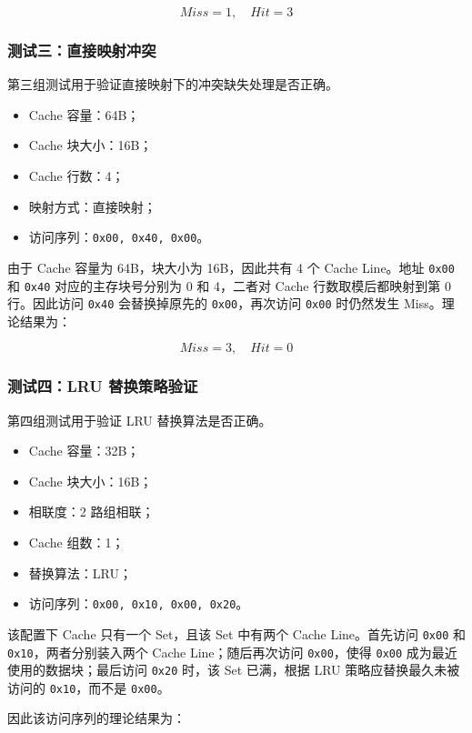 \[
Miss = 1,\quad Hit = 3
\]

\subsubsection{测试三：直接映射冲突}

第三组测试用于验证直接映射下的冲突缺失处理是否正确。

\begin{itemize}
    \item Cache 容量：64B；
    \item Cache 块大小：16B；
    \item Cache 行数：4；
    \item 映射方式：直接映射；
    \item 访问序列：\texttt{0x00, 0x40, 0x00}。
\end{itemize}

由于 Cache 容量为 64B，块大小为 16B，因此共有 4 个 Cache Line。地址 \texttt{0x00} 和 \texttt{0x40} 对应的主存块号分别为 0 和 4，二者对 Cache 行数取模后都映射到第 0 行。因此访问 \texttt{0x40} 会替换掉原先的 \texttt{0x00}，再次访问 \texttt{0x00} 时仍然发生 Miss。理论结果为：

\[
Miss = 3,\quad Hit = 0
\]

\subsubsection{测试四：LRU 替换策略验证}

第四组测试用于验证 LRU 替换算法是否正确。

\begin{itemize}
    \item Cache 容量：32B；
    \item Cache 块大小：16B；
    \item 相联度：2 路组相联；
    \item Cache 组数：1；
    \item 替换算法：LRU；
    \item 访问序列：\texttt{0x00, 0x10, 0x00, 0x20}。
\end{itemize}

该配置下 Cache 只有一个 Set，且该 Set 中有两个 Cache Line。首先访问 \texttt{0x00} 和 \texttt{0x10}，两者分别装入两个 Cache Line；随后再次访问 \texttt{0x00}，使得 \texttt{0x00} 成为最近使用的数据块；最后访问 \texttt{0x20} 时，该 Set 已满，根据 LRU 策略应替换最久未被访问的 \texttt{0x10}，而不是 \texttt{0x00}。

因此该访问序列的理论结果为：

